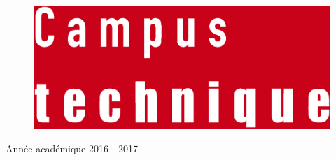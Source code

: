 \begin{center}
  \vspace{1cm}

  \begin{figure}[!h]
    \centering
    \includegraphics[scale=0.08]{textures/logo/technical.eps}
  \end{figure}
  
  \vspace{0.5cm}

  Année académique 2016 - 2017
\end{center}

\thispagestyle{empty}
